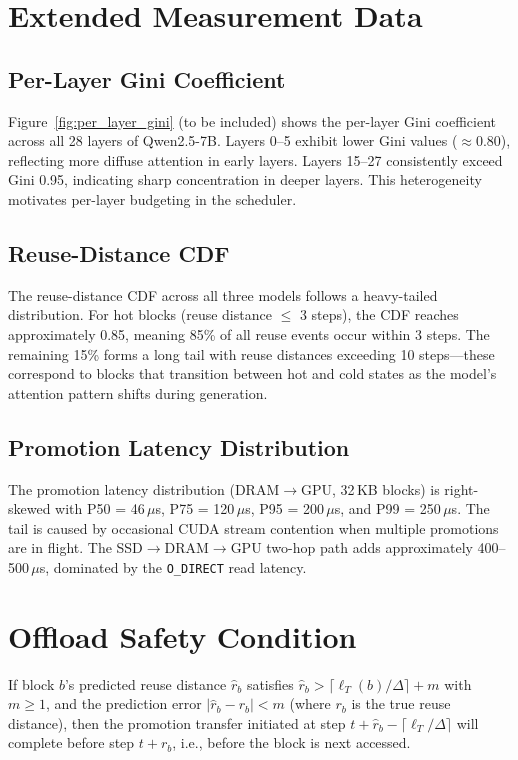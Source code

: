 \documentclass[acmsmall,nonacm,screen]{acmart}
\begin{document}
\section{Extended Measurement Data}\label{app:measurement}

\subsection{Per-Layer Gini Coefficient}

Figure~\ref{fig:per_layer_gini} (to be included) shows the per-layer Gini
coefficient across all 28 layers of Qwen2.5-7B.  Layers 0--5 exhibit lower
Gini values ($\approx$0.80), reflecting more diffuse attention in early
layers.  Layers 15--27 consistently exceed Gini 0.95, indicating sharp
concentration in deeper layers.  This heterogeneity motivates per-layer
budgeting in the scheduler.

\subsection{Reuse-Distance CDF}

The reuse-distance CDF across all three models follows a heavy-tailed
distribution.  For hot blocks (reuse distance $\leq$ 3 steps), the CDF
reaches approximately 0.85, meaning 85\% of all reuse events occur within
3 steps.  The remaining 15\% forms a long tail with reuse distances
exceeding 10 steps---these correspond to blocks that transition between
hot and cold states as the model's attention pattern shifts during generation.

\subsection{Promotion Latency Distribution}

The promotion latency distribution (DRAM$\to$GPU, 32\,KB blocks) is
right-skewed with P50 = 46\,$\mu$s, P75 = 120\,$\mu$s, P95 = 200\,$\mu$s,
and P99 = 250\,$\mu$s.  The tail is caused by occasional CUDA stream
contention when multiple promotions are in flight.  The SSD$\to$DRAM$\to$GPU
two-hop path adds approximately 400--500\,$\mu$s, dominated by the
\texttt{O\_DIRECT} read latency.


\section{Offload Safety Condition}\label{app:proof}

\begin{theorem}
If block $b$'s predicted reuse distance $\hat{r}_b$ satisfies
$\hat{r}_b > \lceil \ell_T(b) / \Delta \rceil + m$ with $m \geq 1$, and the
prediction error $|\hat{r}_b - r_b| < m$ (where $r_b$ is the true reuse
distance), then the promotion transfer initiated at step
$t + \hat{r}_b - \lceil \ell_T / \Delta \rceil$ will complete before step
$t + r_b$, i.e., before the block is next accessed.
\end{theorem}
\end{document}
